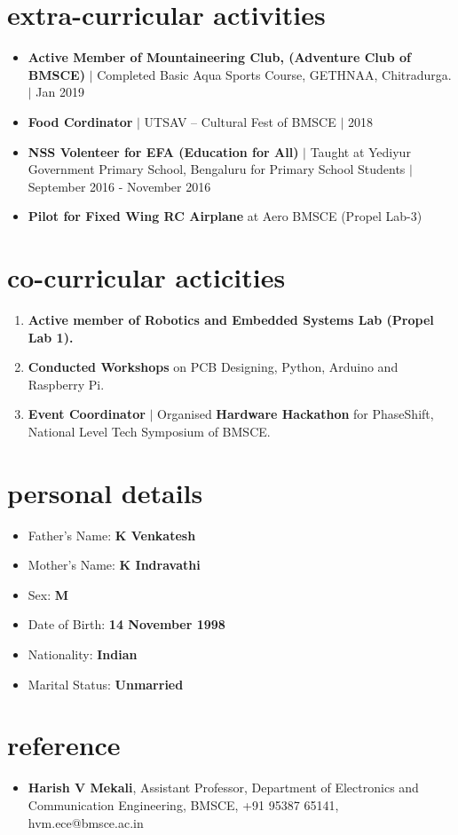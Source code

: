\documentclass[margin,line]{res}
\begin{document}
\begin{resume}
		\section{\sc extra-curricular activities}

			\begin{itemize}
				\item \textbf{Active Member of Mountaineering Club, (Adventure Club of BMSCE)} $\vert$ Completed Basic Aqua Sports Course, GETHNAA, Chitradurga. $\vert$ Jan 2019
				\item \textbf{Food Cordinator} $\vert$ UTSAV -- Cultural Fest of BMSCE $\vert$ 2018
				\item \textbf{NSS Volenteer for EFA (Education for All)} $\vert$ Taught at Yediyur Government Primary School, Bengaluru for Primary School Students $\vert$ September 2016 - November 2016
					\item \textbf{Pilot for Fixed Wing RC Airplane} at Aero BMSCE (Propel Lab-3)
			\end{itemize} 

		\section{\sc co-curricular acticities}

			\begin{enumerate}
				\item \textbf{Active member of Robotics and Embedded Systems Lab (Propel Lab 1).}
				\item \textbf{Conducted Workshops} on PCB Designing, Python, Arduino and Raspberry Pi.
				\item \textbf{Event Coordinator} $\vert$ Organised \textbf{Hardware Hackathon} for PhaseShift, National Level Tech Symposium of BMSCE.
			\end{enumerate}

		\section{\sc personal details}

			\begin{itemize}
				\item Father's Name: \textbf{K Venkatesh}
				\item Mother's Name: \textbf{K Indravathi}
				\item Sex: \textbf{M}
				\item Date of Birth: \textbf{14 November 1998}
				\item Nationality: \textbf{Indian}
				\item Marital Status: \textbf{Unmarried}
			\end{itemize}

		\section{\sc reference}
			\begin{itemize}
				\item \textbf{Harish V Mekali}, Assistant Professor, Department of Electronics and Communication Engineering, BMSCE, +91 95387
65141, hvm.ece@bmsce.ac.in
			\end{itemize}



\end{resume}
\end{document}
